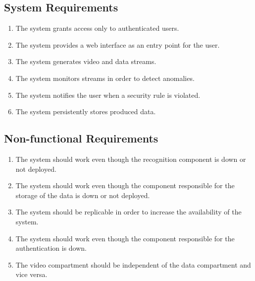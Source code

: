 \documentclass{scrartcl}
\begin{document}
    \subsection{System Requirements}\label{subsec:system-requirements}
    \begin{enumerate}
        \item \label{itm:sys-1} The system grants access only to authenticated users.
        \item \label{itm:sys-2} The system provides a web interface as an entry point for the user.
        \item \label{itm:sys-3} The system generates video and data streams.
        \item \label{itm:sys-4} The system monitors streams in order to detect anomalies.
        \item \label{itm:sys-5} The system notifies the user when a security rule is violated.
        \item \label{itm:sys-6} The system persistently stores produced data.
    \end{enumerate}

    \subsection{Non-functional Requirements}\label{subsec:non-functional-requirements}
    \begin{enumerate}
        \item \label{itm:func-1} The system should work even though the recognition component is down or not deployed.
        \item \label{itm:func-2} The system should work even though the component responsible for the storage of the data is down or not deployed.
        \item \label{itm:func-3} The system should be replicable in order to increase the availability of the system.
        \item \label{itm:func-4} The system should work even though the component responsible for the authentication is down.
        \item \label{itm:func-5} The video compartment should be independent of the data compartment and vice versa.
    \end{enumerate}
\end{document}
